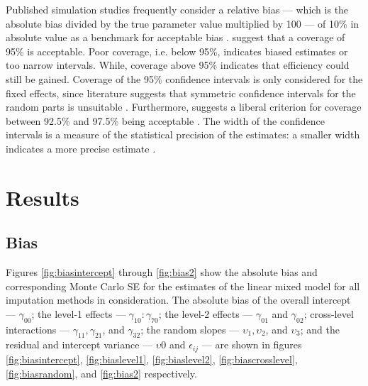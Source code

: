 \documentclass[10pt, a4paper, titlepage]{article}
\begin{document}
Published simulation studies frequently consider a relative bias --- which is the absolute bias divided by the true parameter value multiplied by 100 --- of 10\% in absolute value as a benchmark for acceptable bias \citep{enders2018,enders2018a,enders2020,finch1997}. \citet{morris2019,enders2018,oberman2023,buurenFlexibleImputationMissing2018} suggest that a coverage of 95\% is acceptable. Poor coverage, i.e. below 95\%, indicates biased estimates or too narrow intervals. While, coverage above 95\% indicates that efficiency could still be gained. Coverage of the 95\% confidence intervals is only considered for the fixed effects, since literature suggests that symmetric confidence intervals for the random parts is unsuitable \citep{enders2018,enders2018a,enders2020,maas2005}. Furthermore, \citet{bradley1978} suggests a liberal criterion for coverage between 92.5\% and 97.5\% being acceptable \citep{enders2018,enders2018a,enders2020}.
The width of the confidence intervals is a measure of the statistical precision of the estimates: a smaller width indicates a more precise estimate \citep{oberman2023,buurenFlexibleImputationMissing2018}.

\section{Results}
\graphicspath{{./graphs/}}
\subsection{Bias}
Figures \ref{fig:biasintercept} through \ref{fig:bias2} show the absolute bias and corresponding Monte Carlo SE for the estimates of the linear mixed model for all imputation methods in consideration. The absolute bias of the overall intercept --- $\gamma_{00}$; the level-1 effects --- $\gamma_{10}:\gamma_{70}$; the level-2 effects --- $\gamma_{01}$ and $\gamma_{02}$; cross-level interactions --- $\gamma_{11}, \gamma_{21}$, and $\gamma_{32}$; the random slopes --- $\upsilon_{1}, \upsilon_{2}$, and $\upsilon_{3}$; and the residual and intercept variance --- $\upsilon{0}$ and $\epsilon_{ij}$ --- are shown in figures \ref{fig:biasintercept}, \ref{fig:biaslevel1}, \ref{fig:biaslevel2}, \ref{fig:biascrosslevel}, \ref{fig:biasrandom}, and \ref{fig:bias2} respectively.
\end{document}
